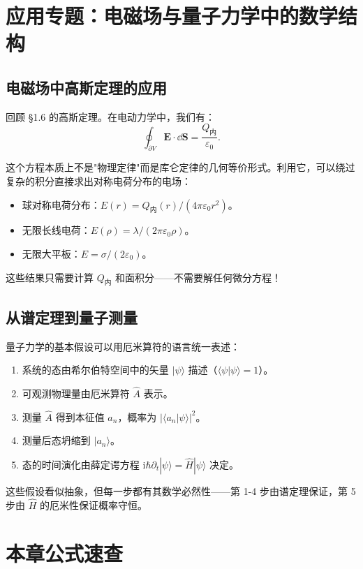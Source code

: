 \section{应用专题：电磁场与量子力学中的数学结构}

\subsection{电磁场中高斯定理的应用}

回顾 \S1.6 的高斯定理。在电动力学中，我们有：
\[
\oint_{\partial V}\mathbf{E}\cdot\dd\mathbf{S} = \frac{Q_{\text{内}}}{\varepsilon_0}.
\]

这个方程本质上不是"物理定律"而是库仑定律的几何等价形式。利用它，可以绕过复杂的积分直接求出对称电荷分布的电场：

\begin{itemize}
  \item 球对称电荷分布：$E(r) = Q_{\text{内}}(r)/(4\pi\varepsilon_0 r^2)$。
  \item 无限长线电荷：$E(\rho) = \lambda/(2\pi\varepsilon_0\rho)$。
  \item 无限大平板：$E = \sigma/(2\varepsilon_0)$。
\end{itemize}

这些结果只需要计算 $Q_{\text{内}}$ 和面积分——不需要解任何微分方程！

\subsection{从谱定理到量子测量}

量子力学的基本假设可以用厄米算符的语言统一表述：

\begin{enumerate}
  \item 系统的态由希尔伯特空间中的矢量 $|\psi\rangle$ 描述（$\langle\psi|\psi\rangle=1$）。
  \item 可观测物理量由厄米算符 $\hat{A}$ 表示。
  \item 测量 $\hat{A}$ 得到本征值 $a_n$，概率为 $|\langle a_n|\psi\rangle|^2$。
  \item 测量后态坍缩到 $|a_n\rangle$。
  \item 态的时间演化由薛定谔方程 $\mathrm{i}\hbar\partial_t|\psi\rangle = \hat{H}|\psi\rangle$ 决定。
\end{enumerate}

这些假设看似抽象，但每一步都有其数学必然性——第 1-4 步由谱定理保证，第 5 步由 $\hat{H}$ 的厄米性保证概率守恒。

\section{本章公式速查}

